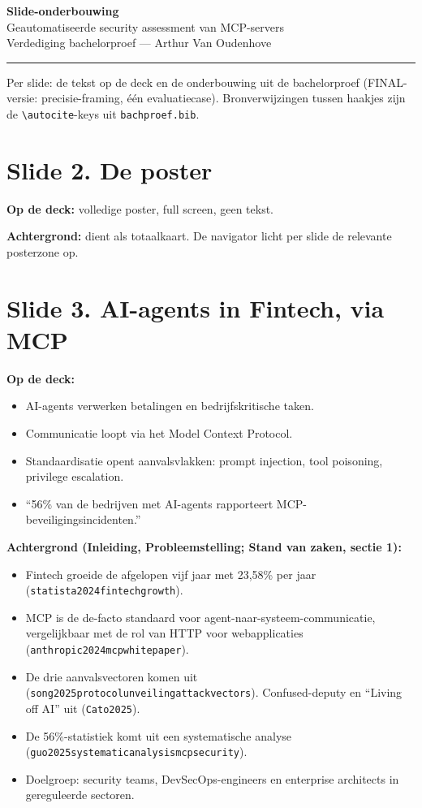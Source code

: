 \documentclass[11pt,a4paper]{article}
\newcommand{\code}[1]{\texttt{\small #1}}
\begin{document}
{\Huge\bfseries\color{hgteal} Slide-onderbouwing}\\[0.4em]
{\large Geautomatiseerde security assessment van MCP-servers}\\[0.2em]
{\color{hggrey} Verdediging bachelorproef --- Arthur Van Oudenhove}

\vspace{0.8em}
\hrule
\vspace{0.6em}

Per slide: de tekst op de deck en de onderbouwing uit de bachelorproef
(FINAL-versie: precisie-framing, \'e\'en evaluatiecase). Bronverwijzingen tussen
haakjes zijn de \code{\textbackslash autocite}-keys uit \code{bachproef.bib}.

\section{Slide 2. De poster}
\textbf{Op de deck:} volledige poster, full screen, geen tekst.

\textbf{Achtergrond:} dient als totaalkaart. De navigator licht per slide de
relevante posterzone op.

\section{Slide 3. AI-agents in Fintech, via MCP}
\textbf{Op de deck:}
\begin{itemize}
  \item AI-agents verwerken betalingen en bedrijfskritische taken.
  \item Communicatie loopt via het Model Context Protocol.
  \item Standaardisatie opent aanvalsvlakken: prompt injection, tool poisoning, privilege escalation.
  \item ``56\% van de bedrijven met AI-agents rapporteert MCP-beveiligingsincidenten.''
\end{itemize}

\textbf{Achtergrond (Inleiding, Probleemstelling; Stand van zaken, sectie 1):}
\begin{itemize}
  \item Fintech groeide de afgelopen vijf jaar met 23,58\% per jaar (\code{statista2024fintechgrowth}).
  \item MCP is de de-facto standaard voor agent-naar-systeem-communicatie, vergelijkbaar met de rol van HTTP voor webapplicaties (\code{anthropic2024mcpwhitepaper}).
  \item De drie aanvalsvectoren komen uit (\code{song2025protocolunveilingattackvectors}). Confused-deputy en ``Living off AI'' uit (\code{Cato2025}).
  \item De 56\%-statistiek komt uit een systematische analyse (\code{guo2025systematicanalysismcpsecurity}).
  \item Doelgroep: security teams, DevSecOps-engineers en enterprise architects in gereguleerde sectoren.
\end{itemize}
\end{document}
